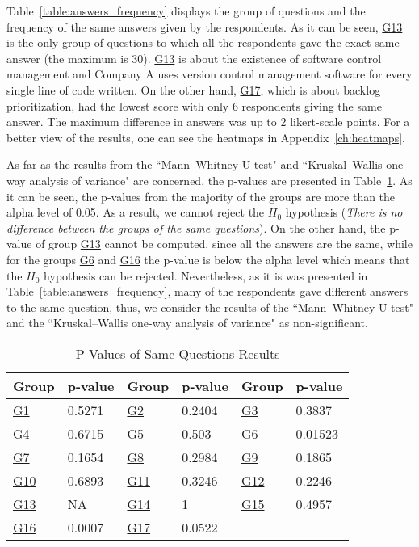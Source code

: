 Table~\ref{table:answers_frequency} displays the group of questions and the frequency of the same answers given by the respondents. As it can be seen, \hyperref[G13]{G13} is the only group of questions to which all the respondents gave the exact same answer (the maximum is 30). \hyperref[G13]{G13} is about the existence of software control management and Company A uses version control management software for every single line of code written. On the other hand, \hyperref[G17]{G17}, which is about backlog prioritization, had the lowest score with only 6 respondents giving the same answer. The maximum difference in answers was up to 2 likert-scale points. For a better view of the results, one can see the heatmaps in Appendix~\ref{ch:heatmaps}.

As far as the results from the ``Mann–Whitney U test" and ``Kruskal–Wallis one-way analysis of variance" are concerned, the p-values are presented in Table~\ref{table:direct_match_answers_pvalues}. As it can be seen, the p-values from the majority of the groups are more than the alpha level of 0.05. As a result, we cannot reject the $H_0$ hypothesis (\textit{There is no difference between the groups of the same questions}).
On the other hand, the p-value of group \hyperref[G13]{G13} cannot be computed, since all the answers are the same, while for the groups \hyperref[G6]{G6} and \hyperref[G16]{G16} the p-value is below the alpha level which means that the $H_0$ hypothesis can be rejected. Nevertheless, as it is was presented in Table~\ref{table:answers_frequency}, many of the respondents gave different answers to the same question, thus, we consider the results of the ``Mann–Whitney U test" and the ``Kruskal–Wallis one-way analysis of variance" as non-significant.

\begin{table} [H]
	\begin{tabular}{| p{1cm} | p{2cm} | p{1cm} | p{2cm} | p{1cm} | p{2cm} |} \hline
		Group & p-value & Group & p-value & Group & p-value \\ \hline
		\hyperref[G1]{G1} & 0.5271 & \hyperref[G2]{G2} & 0.2404 & \hyperref[G3]{G3} & 0.3837 \\ \hline
		\hyperref[G4]{G4} & 0.6715 & \hyperref[G5]{G5} & 0.503 & \hyperref[G6]{G6} & 0.01523 \\ \hline
		\hyperref[G7]{G7} & 0.1654 & \hyperref[G8]{G8} & 0.2984 & \hyperref[G9]{G9} & 0.1865 \\ \hline
		\hyperref[G10]{G10} & 0.6893 & \hyperref[G11]{G11} & 0.3246 & \hyperref[G12]{G12} & 0.2246 \\ \hline
		\hyperref[G13]{G13} & NA & \hyperref[G14]{G14} & 1 & \hyperref[G15]{G15} & 0.4957 \\ \hline
		\hyperref[G16]{G16} & 0.0007 & \hyperref[G17]{G17} & 0.0522 & & \\ \hline
	\end{tabular}
	\caption{P-Values of Same Questions Results}
	\label{table:direct_match_answers_pvalues}
\end{table}

